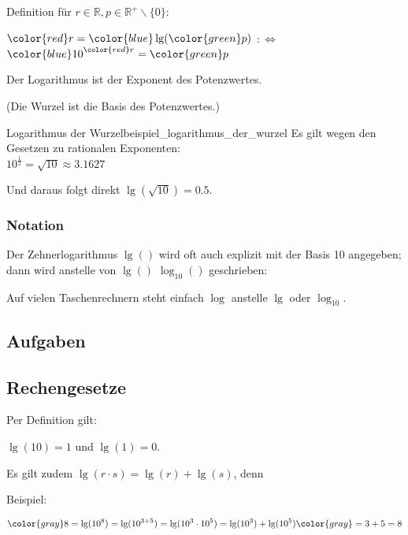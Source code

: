 Definition für $r\in\mathbb{R}, p \in \mathbb{R}^{+}\backslash\{0\}$:
\begin{definition}{}{}
  \begin{center}
    ${\color{red}r} = {\color{blue}\lg}({\color{green}p})$
    $:\Leftrightarrow$
    ${\color{blue}10}^{\color{red}r}={\color{green}p}$
    \end{center}
\end{definition}

Der Logarithmus ist der Exponent des Potenzwertes.

(Die Wurzel ist die Basis des Potenzwertes.)

\begin{beispiel}{Logarithmus der
    Wurzel}{beispiel_logarithmus_der_wurzel}
  Es gilt wegen den Gesetzen zu rationalen Exponenten:\\
$10^{\frac12} = \sqrt{10} \approx 3.1627$

  Und daraus folgt direkt $\lg(\sqrt{10}) = 0.5$.
\end{beispiel}

\subsubsection{Notation}
Der Zehnerlogarithmus $\lg()$ wird oft auch explizit mit der Basis 10
angegeben; dann wird anstelle von $\lg()$ $\log_{10}()$ geschrieben:

\begin{center}
\end{center}

Auf vielen Taschenrechnern steht einfach $\log$ anstelle $\lg$ oder $\log_{10}$.
\newpage


\subsection*{Aufgaben}

\newpage


\subsection{Rechengesetze}
Per Definition gilt:

$\lg(10) = 1$ und $\lg(1) = 0$.

Es gilt zudem $\lg(r\cdot s) = \lg(r) + \lg(s)$, denn


Beispiel: 

$${\color{gray}8=\lg(10^8)=\lg(10^{3+5})}=\lg(10^3\cdot{}10^5) = \lg(10^3)+\lg(10^5){\color{gray}=3+5=8}$$
